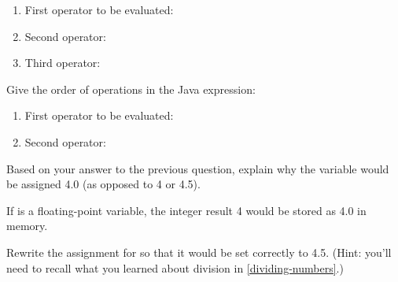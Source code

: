 \begin{enumerate}
\item First operator to be evaluated: \ans{\java{-}}
\item Second operator: \ans{\java{*}}
\item Third operator: \ans{\java{=}}
\end{enumerate}


\Q Give the order of operations in the Java expression: ~ 

\begin{enumerate}
\item First operator to be evaluated: \ans{\java{/}}
\item Second operator: \ans{\java{=}}
\end{enumerate}


\Q Based on your answer to the previous question, explain why the variable  would be assigned 4.0 (as opposed to 4 or 4.5).

\begin{answer}
If  is a floating-point variable, the integer result 4 would be stored as 4.0 in memory.
\end{answer}


\Q Rewrite the assignment for  so that it would be set correctly to 4.5. (Hint: you'll need to recall what you learned about division in \ref{dividing-numbers}.)

\begin{answer}
\end{answer}
